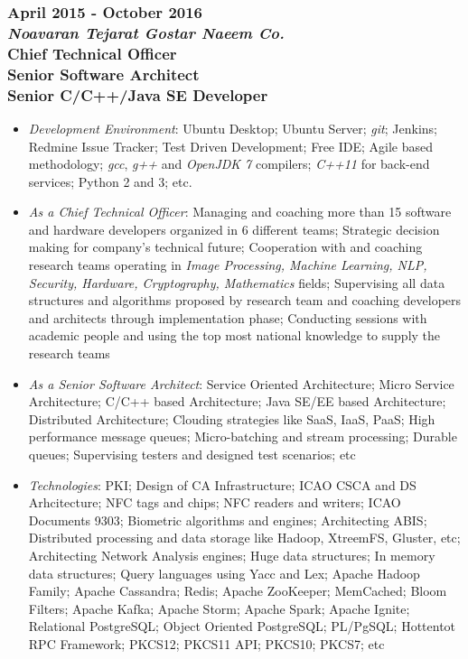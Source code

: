 \documentclass[10pt,a4paper]{article}
\begin{document}
\subsubsection{{April 2015 - October 2016} \\ \textnormal {\textit {Noavaran Tejarat Gostar Naeem Co.}} \\ {Chief Technical Officer \\ Senior Software Architect \\ Senior C/C++/Java SE Developer}}
  \setlength{\leftskip}{0.5cm}
  \setlength{\rightskip}{1cm}
  \begin{itemize}
    \setlength{\rightskip}{1cm}
    \setlength\itemsep{0em}
    \item \small \textit {Development Environment}: Ubuntu Desktop; Ubuntu Server; \textit{git}; Jenkins; Redmine Issue Tracker; Test Driven Development; Free IDE; Agile based methodology; \textit {gcc}, \textit{g++} and \textit{OpenJDK 7} compilers; \textit{C++11} for back-end services; Python 2 and 3; etc.
    \item \small \textit {As a Chief Technical Officer}: Managing and coaching more than 15 software and hardware developers organized in 6 different teams; Strategic decision making for company's technical future; Cooperation with and coaching research teams operating in \textit {Image Processing, Machine Learning, NLP, Security, Hardware, Cryptography, Mathematics} fields; Supervising all data structures and algorithms proposed by research team and coaching developers and architects through implementation phase; Conducting sessions with academic people and using the top most national knowledge to supply the research teams
    \item \small \textit {As a Senior Software Architect}: Service Oriented Architecture; Micro Service Architecture; C/C++ based Architecture; Java SE/EE based Architecture; Distributed Architecture; Clouding strategies like SaaS, IaaS, PaaS; High performance message queues; Micro-batching and stream processing; Durable queues; Supervising testers and designed test scenarios; etc
    \item \small \textit {Technologies}: PKI; Design of CA Infrastructure; ICAO CSCA and DS Arhcitecture; NFC tags and chips; NFC readers and writers; ICAO Documents 9303; Biometric algorithms and engines; Architecting ABIS; Distributed processing and data storage like Hadoop, XtreemFS, Gluster, etc; Architecting Network Analysis engines; Huge data structures; In memory data structures; Query languages using Yacc and Lex; Apache Hadoop Family; Apache Cassandra; Redis; Apache ZooKeeper; MemCached; Bloom Filters; Apache Kafka; Apache Storm; Apache Spark; Apache Ignite; Relational PostgreSQL; Object Oriented PostgreSQL; PL/PgSQL; Hottentot RPC Framework; PKCS12; PKCS11 API; PKCS10; PKCS7; etc

\end{itemize}
\end{document}
